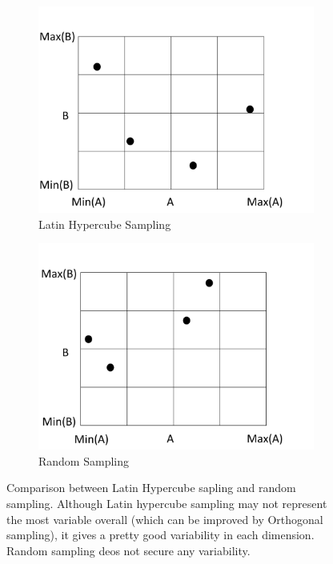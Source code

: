 \documentclass[14pt]{report}
\numberwithin{equation}{chapter}
\begin{document}
\begin{spacing}{2}
\begin{figure}
\begin{subfigure}{0.5\textwidth}
\centering
\includegraphics[scale = 0.3]{LHS.pdf}
\caption{Latin Hypercube Sampling}
\end{subfigure}
\hspace*{0.02\textwidth}
\begin{subfigure}{0.5\textwidth}
\centering
\includegraphics[scale = 0.3]{RS.pdf}
\caption{Random Sampling}
\end{subfigure}
\caption{Comparison between Latin Hypercube sapling and random sampling. Although Latin hypercube sampling may not represent the most variable overall (which can be improved by Orthogonal sampling), it gives a pretty good variability in each dimension. Random sampling deos not secure any variability. }
\end{figure}




\end{spacing}
\end{document}

